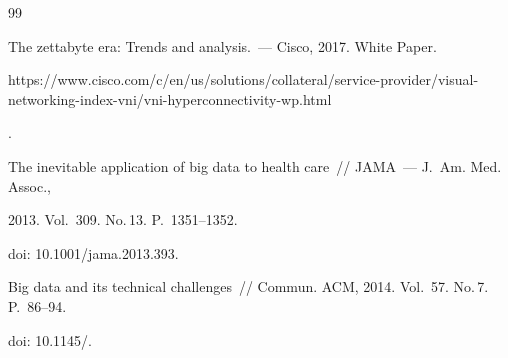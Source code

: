 {\small\frenchspacing


{%




\begin{thebibliography}{99}





\vspace*{-3pt}





    




    The zettabyte era: Trends and analysis.~--- Cisco, 2017. White Paper.


     {\sf 


     https://www.cisco.com/c/en/us/solutions/collateral/service-provider/visual-networking-index-vni/vni-hyperconnectivity-wp.html}.


    


   


    






   The inevitable application of big data to health care~/\!\!/ JAMA~--- J.~Am. Med. Assoc., 


2013.  Vol.~309. No.\,13. P.~1351--1352.


doi: 10.1001\!/\linebreak jama.2013.393.









Big data and its technical challenges~/\!\!/ Commun. ACM, 2014. Vol.~57. No.\,7. P.~86--94.


doi: 10.1145\!/.


    


    




\end{thebibliography}}}
